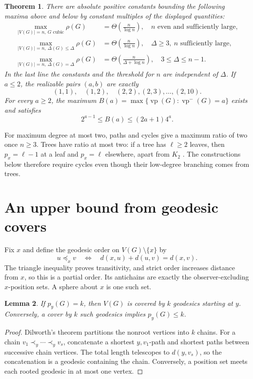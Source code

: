 \documentclass[11pt]{article}
\newtheorem{theorem}{Theorem}
\newtheorem{lemma}[theorem]{Lemma}
\theoremstyle{remark}\newtheorem{remark}[theorem]{Remark}
\newcommand{\vp}{\operatorname{vp}}
\newcommand{\vpm}{\operatorname{vp}^{-}}
\begin{document}
\begin{theorem}\label{thm:main}
There are absolute positive constants bounding the following maxima above
and below by constant multiples of the displayed quantities:
\[
\begin{array}{ll}
\displaystyle\max_{|V(G)|=n,\ G\text{ cubic}}\rho(G)
   &\displaystyle=\Theta\!\left(\frac n{\log n}\right),\quad n\text{ even and sufficiently large},\\[6pt]
\displaystyle\max_{|V(G)|=n,\ \Delta(G)\le\Delta}\rho(G)
   &\displaystyle=\Theta\!\left(\frac n{\log n}\right),\quad \Delta\ge3,\ n\text{ sufficiently large},\\[6pt]
\displaystyle\max_{|V(G)|=n,\ \Delta(G)=\Delta}\rho(G)
   &\displaystyle=\Theta\!\left(\frac n{\Delta+\log n}\right),\quad 3\le\Delta\le n-1.
\end{array}
\]
In the last line the constants and the threshold for $n$ are independent of
$\Delta$. If $a\le2$, the realizable pairs $(a,b)$ are exactly
\[
 (1,1),\quad(1,2),\quad(2,2),(2,3),\ldots,(2,10).
\]
For every $a\ge2$, the maximum $B(a)=\max\{\vp(G):\vpm(G)=a\}$ exists and satisfies
\begin{equation}\label{eq:Ba}
 2^{a-1}\le B(a)\le(2a+1)4^a.
\end{equation}
\end{theorem}

For maximum degree at most two, paths and cycles give a maximum ratio of two
once $n\ge3$. Trees have ratio at most two: if a tree has $\ell\ge2$ leaves,
then $p_x=\ell-1$ at a leaf and $p_x=\ell$ elsewhere, apart from $K_2$
\cite[Corollary 3.6]{position}. The constructions below therefore require
cycles even though their low-degree branching comes from trees.

\section{An upper bound from geodesic covers}
Fix $x$ and define the geodesic order on $V(G)\setminus\{x\}$ by
\[
 u\preceq_x v\quad\Longleftrightarrow\quad d(x,u)+d(u,v)=d(x,v).
\]
The triangle inequality proves transitivity, and strict order increases
distance from $x$, so this is a partial order. Its antichains are exactly
the observer-excluding $x$-position sets. A sphere about $x$ is one such set.

\begin{lemma}\label{lem:rootcover}
If $p_y(G)=k$, then $V(G)$ is covered by $k$ geodesics starting at $y$.
Conversely, a cover by $k$ such geodesics implies $p_y(G)\le k$.
\end{lemma}
\begin{proof}
Dilworth's theorem \cite{dilworth} partitions the nonroot vertices into $k$
chains. For a chain $v_1\prec_y\cdots\prec_y v_s$, concatenate a shortest
$y,v_1$-path and shortest paths between successive chain vertices. The total
length telescopes to $d(y,v_s)$, so the concatenation is a geodesic containing
the chain. Conversely, a position set meets each rooted geodesic in at most
one vertex.
\end{proof}
\end{document}

